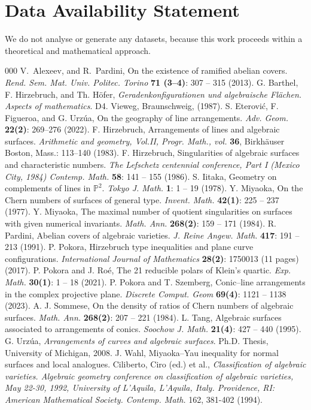 \documentclass[12pt]{amsart}
\theoremstyle{plain}
\theoremstyle{definition}
\begin{document}
\section*{Data Availability Statement}
We do not analyse or generate any datasets, because this work proceeds within a theoretical and mathematical approach. 
\begin{thebibliography}{000}
 V.~Alexeev, and R.~Pardini,  On the existence of ramified abelian covers. \textit{Rend. Sem. Mat.  Univ. Politec. Torino} \textbf{71  (3--4)}: 307 -- 315 (2013). 
G. Barthel, F. Hirzebruch, and Th. H\"ofer, \textit{Geradenkonfigurationen und algebraische Fl\"achen. Aspects of mathematics}.  D4. Vieweg, Braunschweig, (1987).
S. Eterovi\'c, F. Figueroa, and G. Urz\'ua, On the geography of line arrangements. \textit{Adv. Geom.} \textbf{22(2)}: 269--276 (2022).
F. Hirzebruch, Arrangements of lines and algebraic surfaces. \textit{Arithmetic and geometry, Vol.II, Progr. Math., vol.} \textbf{36}, Birkh\"auser Boston, Mass.: 113--140 (1983).
F. Hirzebruch, Singularities of algebraic surfaces and characteristic numbers. \textit{The Lefschetz centennial conference, Part I (Mexico City, 1984) Contemp. Math.} \textbf{58}: 141 -- 155 (1986).
S. Iitaka, Geometry on complements of lines in $\mathbb{P}^{2}$. \textit{Tokyo J. Math.} \textbf{1}: 1 -- 19 (1978).
Y. Miyaoka, On the Chern numbers of surfaces of general type. \textit{Invent. Math.} \textbf{42(1)}: 225 -- 237 (1977).
Y. Miyaoka, The maximal number of quotient singularities on surfaces with given numerical invariants. \textit{Math. Ann.} \textbf{268(2)}: 159 -- 171 (1984).
R. Pardini, Abelian covers of algebraic varieties. \textit{J. Reine Angew. Math.} \textbf{417}: 191 -- 213 (1991).
P. Pokora, Hirzebruch type inequalities and plane curve configurations. \textit{International Journal of Mathematics} \textbf{28(2)}: 1750013 (11 pages) (2017).
P. Pokora and J. Ro\'e, The 21 reducible polars of Klein's quartic. \textit{Exp. Math.} \textbf{30(1)}: 1 -- 18 (2021).
P. Pokora and T. Szemberg, Conic--line arrangements in the complex projective plane. \textit{Discrete Comput. Geom} \textbf{69(4)}: 1121 -- 1138 (2023).
A. J. Sommese, \newblock On the density of ratios of Chern numbers of algebraic surfaces. \textit{Math. Ann.} \textbf{268(2)}: 207 -- 221 (1984).
L. Tang, Algebraic surfaces associated to arrangements of conics. \textit{Soochow J. Math.} \textbf{21(4)}: 427 -- 440 (1995).
G. Urz\'ua, \emph{Arrangements of curves and algebraic surfaces}. Ph.D. Thesis, University of Michigan, 2008. 
J. Wahl, Miyaoka--Yau inequality for normal surfaces and local analogues. \newblock Ciliberto, Ciro (ed.) et al., \textit{Classification of algebraic varieties. Algebraic geometry conference on classification of algebraic varieties, May 22-30, 1992, University of L\textquoteright Aquila, L\textquoteright Aquila, Italy. Providence, RI: American Mathematical Society. Contemp. Math.} 162, 381-402 (1994). 
\end{thebibliography}
\end{document}

